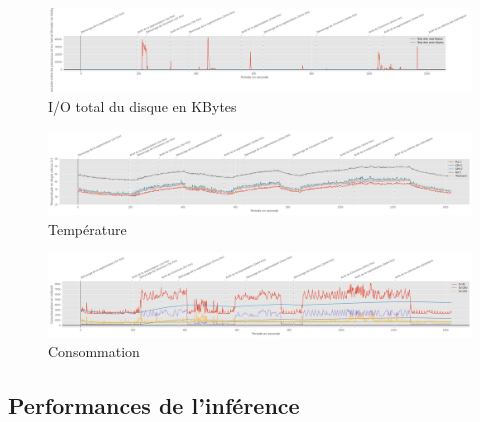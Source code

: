 {\begin{landscape}
\begin{figure}[H]
      \centering
      \includegraphics[width=1.5\textwidth]{io_totaldisk}
      \caption{I/O total du disque en KBytes}
      \label{fig:io_totaldisk}
   \end{figure} 
   \begin{figure}[H]
      \centering
      \includegraphics[width=1.5\textwidth]{temperature}
      \caption{Température}
      \label{fig:temperature}
   \end{figure} 
   \begin{figure}[H]
      \centering
      \includegraphics[width=1.5\textwidth]{consommation}
      \caption{Consommation}
      \label{fig:consommation}
   \end{figure}
   \end{landscape}
   \clearpage
   \newpage
}
\subsection{Performances de l'inférence}
